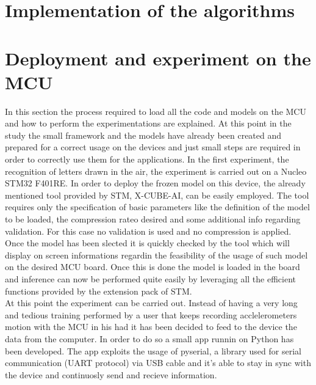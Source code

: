 \documentclass[12pt]{report}
\begin{document}
\section{Implementation of the algorithms}



\section{Deployment and experiment on the MCU}
In this section the process required to load all the code and models on the MCU and how to perform the experimentations are explained. At this point in the study the small framework and the models have already been created and prepared for a correct usage on the devices and just small steps are required in order to correctly use them for the applications. \bigskip
In the first experiment, the recognition of letters drawn in the air, the experiment is carried out on a Nucleo STM32 F401RE. In order to deploy the frozen model on this device, the already mentioned tool provided by STM, X-CUBE-AI, can be easily employed. The tool requires only the specification of basic parameters like the definition of the model to be loaded, the compression rateo desired and some additional info regarding validation. For this case no validation is used and no compression is applied. Once the model has been slected it is quickly checked by the tool which will display on screen informations regardin the feasibility of the usage of such model on the desired MCU board. Once this is done the model is loaded in the board and inference can now be performed quite easily by leveraging all the efficient functions provided by the extension pack of STM. \\
At this point the experiment can be carried out. Instead of having a very long and tedious training performed by a user that keeps recording acclelerometers motion with the MCU in his had it has been decided to feed to the device the data from the computer. In order to do so a small app runnin on Python has been developed. The app exploits the usage of pyserial, a library used for serial communication (UART protocol) via USB cable and it's able to stay in sync with the device and continuosly send and recieve information. 
\end{document}
